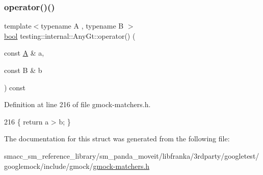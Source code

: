 \subsubsection{\texorpdfstring{operator()()}{operator()()}}
{\footnotesize\ttfamily template$<$typename A , typename B $>$ \\
\hyperlink{classbool}{bool} testing\+::internal\+::\+Any\+Gt\+::operator() (\begin{DoxyParamCaption}\item[{const \hyperlink{namespacetesting_a5e9134d655d2fc9323902348083282e7}{A} \&}]{a,  }\item[{const B \&}]{b }\end{DoxyParamCaption}) const\hspace{0.3cm}{\ttfamily [inline]}}



Definition at line 216 of file gmock-\/matchers.\+h.


\begin{DoxyCode}
216 \{ \textcolor{keywordflow}{return} a > b; \}
\end{DoxyCode}


The documentation for this struct was generated from the following file\+:\begin{DoxyCompactItemize}
\item 
smacc\+\_\+sm\+\_\+reference\+\_\+library/sm\+\_\+panda\+\_\+moveit/libfranka/3rdparty/googletest/googlemock/include/gmock/\hyperlink{gmock-matchers_8h}{gmock-\/matchers.\+h}\end{DoxyCompactItemize}
